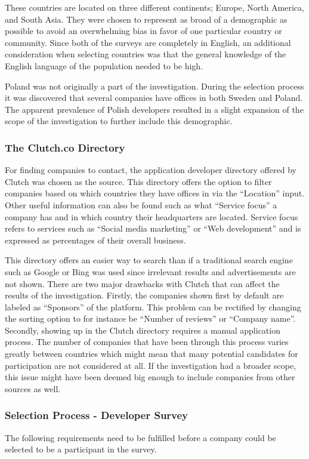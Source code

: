 \documentclass[a4paper,12pt]{article}
\begin{document}
These countries are located on three different continents; Europe, North America, and South Asia. They were chosen to represent as broad of a demographic as possible to avoid an overwhelming bias in favor of one particular country or community. Since both of the surveys are completely in English, an additional consideration when selecting countries was that the general knowledge of the English language of the population needed to be high.

Poland was not originally a part of the investigation. During the selection process it was discovered that several companies have offices in both Sweden and Poland. The apparent prevalence of Polish developers resulted in a slight expansion of the scope of the investigation to further include this demographic.

\subsubsection{The Clutch.co Directory}
For finding companies to contact, the application developer directory offered by Clutch \cite{clutch} was chosen as the source. This directory offers the option to filter companies based on which countries they have offices in via the “Location” input. Other useful information can also be found such as what “Service focus” a company has and in which country their headquarters are located. Service focus refers to services such as “Social media marketing” or “Web development” and is expressed as percentages of their overall business.

This directory offers an easier way to search than if a traditional search engine such as Google or Bing was used since irrelevant results and advertisements are not shown. There are two major drawbacks with Clutch that can affect the results of the investigation. Firstly, the companies shown first by default are labeled as “Sponsors” of the platform. This problem can be rectified by changing the sorting option to for instance be “Number of reviews” or “Company name”. Secondly, showing up in the Clutch directory requires a manual application process. The number of companies that have been through this process varies greatly between countries which might mean that many potential candidates for participation are not considered at all. If the investigation had a broader scope, this issue might have been deemed big enough to include companies from other sources as well. 

\subsubsection{Selection Process - Developer Survey}
The following requirements need to be fulfilled before a company could be selected to be a participant in the survey. 
\end{document}
